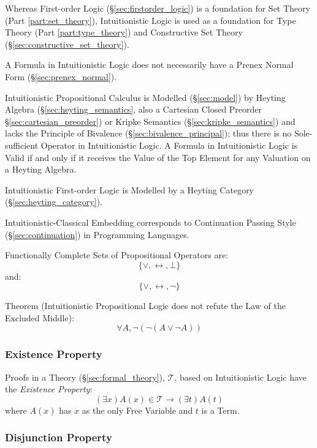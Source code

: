 Whereas First-order Logic (\S\ref{sec:firstorder_logic}) is a
foundation for Set Theory (Part \ref{part:set_theory}), Intuitionistic
Logic is used as a foundation for Type Theory (Part
\ref{part:type_theory}) and Constructive Set Theory
(\S\ref{sec:constructive_set_theory}).

A Formula in Intuitionistic Logic does not necessarily have a Prenex
Normal Form (\S\ref{sec:prenex_normal}).

Intuitionistic Propositional Calculus is Modelled (\S\ref{sec:model})
by Heyting Algebra (\S\ref{sec:heyting_semantics}, also a Cartesian
Closed Preorder \S\ref{sec:cartesian_preorder}) or Kripke Semantics
(\S\ref{sec:kripke_semantics}) and lacks the Principle of Bivalence
(\S\ref{sec:bivalence_principal}); thus there is no Sole-sufficient
Operator in Intuitionistic Logic. A Formula in Intuitionistic Logic is
Valid if and only if it receives the Value of the Top Element for any
Valuation on a Heyting Algebra.

Intuitionistic First-order Logic is Modelled by a Heyting Category
(\S\ref{sec:heyting_category}).

Intuitionistic-Classical Embedding corresponds to Continuation Passing
Style (\S\ref{sec:continuation}) in Programming Languages.

Functionally Complete Sets of Propositional Operators are:
\[
  \{ \vee, \leftrightarrow, \bot \}
\]
and:
\[
  \{ \vee, \leftrightarrow, \neg \}
\]

Theorem (Intuitionistic Propositional Logic does not refute the Law of
the Excluded Middle)\cite{harper12}:
\[
  \forall A, \neg (\neg (A \vee \neg A))
\]



\subsubsection{Existence Property}\label{sec:existence_property}

Proofs in a Theory (\S\ref{sec:formal_theory}), $\mathcal{T}$, based
on Intuitionistic Logic have the \emph{Existence Property}:
\[
  (\exists x)A(x) \in \mathcal{T} \rightarrow (\exists t)A(t)
\]
where $A(x)$ has $x$ as the only Free Variable and $t$ is a Term.



\subsubsection{Disjunction Property}\label{sec:disjunction_property}

